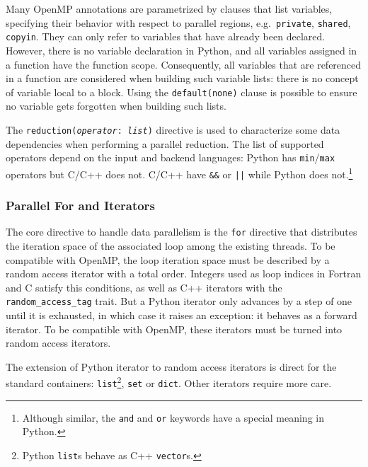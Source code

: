 \documentclass{llncs}
\begin{document}
Many OpenMP annotations are parametrized by clauses that list variables,
specifying their behavior with respect to parallel regions, e.g.\
\texttt{private}, \texttt{shared}, \texttt{copyin}. They can only refer to
variables that have already been declared. However, there is no variable
declaration in Python, and all variables assigned in a function have the
function scope. Consequently, all variables that are referenced in a function
are considered when building such variable lists: there is no concept of
variable local to a block. Using the \texttt{default(none)} clause is possible
to ensure no variable gets forgotten when building such lists.


The \texttt{reduction(\emph{operator}: \emph{list})} directive is used to
characterize some data dependencies when performing a parallel reduction. The
list of supported operators depend on the input and backend languages: Python
has \texttt{min}/\texttt{max} operators but C/C++ does not. C/C++ have
\texttt{\&\&} or \texttt{||} while Python does not.\footnote{Although similar,
the \texttt{and} and \texttt{or} keywords have a special meaning in Python.}

\subsubsection{Parallel For and Iterators}

The core directive to handle data parallelism is the \texttt{for} directive that
distributes the iteration space of the associated loop among the existing
threads. To be compatible with OpenMP, the loop iteration space must be
described by a random access iterator with a total order. Integers used as loop
indices in Fortran and C satisfy this conditions, as well as C++ iterators with
the \texttt{random\_access\_tag} trait. But a Python iterator only advances by a
step of one until it is exhausted, in which case it raises an exception: it
behaves as a forward iterator. To be compatible with OpenMP, these iterators
must be turned into random access iterators.

The extension of Python iterator to random access iterators is direct for the
standard containers: \texttt{list}\footnote{Python \texttt{list}s behave as C++
\texttt{vector}s.}, \texttt{set} or \texttt{dict}. Other iterators require more
care.
\end{document}

